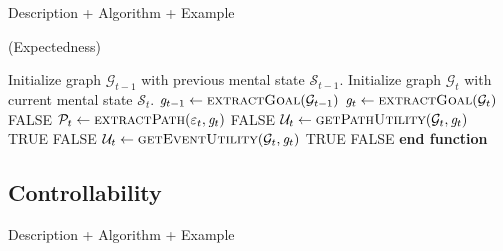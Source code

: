 \documentclass[letterpaper]{article}
\begin{document}
Description + Algorithm + Example

\begin{algorithm}
	\caption{(Expectedness)}
	\label{array-sum}
	\begin{algorithmic}[1]
			\Statex
			\State Initialize graph $\mathcal{G}_{t-1}$ with previous mental state
			$\mathcal{S}_{t-1}$.
			\State Initialize graph $\mathcal{G}_{t}$ with current mental state
			$\mathcal{S}_{t}$.
			\Statex
			\State $\mathit{g}_{t-1} \gets \Call{extractGoal}{\mathcal{G}_{t-1}}$
			\State $\mathit{g}_{t} \gets \Call{extractGoal}{\mathcal{G}_{t}}$
			\Statex
					\State \Return FALSE
				\Else
					\State $\mathcal{P}_{t} \gets \Call{extractPath}{\varepsilon_t,
					\mathit{g}_{t}}$
						\State \Return FALSE
					\Else
						\State $\mathcal{U}_{t} \gets
						\Call{getPathUtility}{\mathcal{G}_{t}, \mathit{g}_{t}}$
							\State \Return TRUE
						\Else
							\State \Return FALSE
						\EndIf
					\EndIf
				\EndIf
			\Else
				\State $\mathcal{U}_{t} \gets
						\Call{getEventUtility}{\mathcal{G}_{t}, \mathit{g}_{t}}$
					\State \Return TRUE
				\Else
					\State \Return FALSE
				\EndIf
			\EndIf
		\EndFunction
		\State \textbf{end function}
	\end{algorithmic}
\end{algorithm}

\subsection{Controllability}

Description + Algorithm + Example
\end{document}
